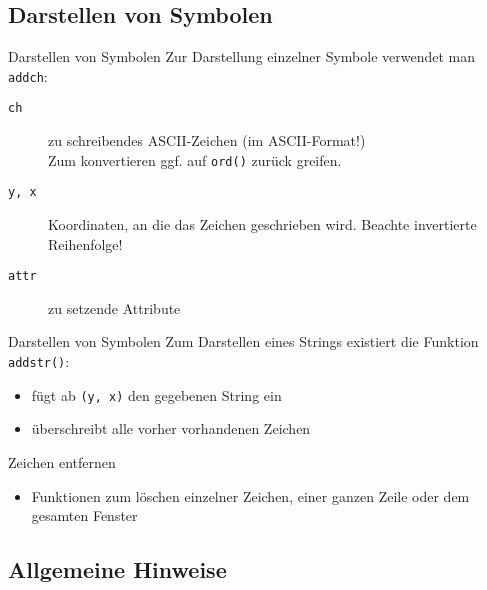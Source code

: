 \subsection{Darstellen von Symbolen}

\begin{frame}{Darstellen von Symbolen}
	Zur Darstellung einzelner Symbole verwendet man \texttt{addch}:
	
	
	
	\begin{description}
		\item [\texttt{ch}] zu schreibendes ASCII-Zeichen (im ASCII-Format!) \\ Zum konvertieren ggf. auf \texttt{ord()} zurück greifen.
		\item [\texttt{y, x}] Koordinaten, an die das Zeichen geschrieben wird. Beachte invertierte Reihenfolge!
		\item [\texttt{attr}] zu setzende Attribute
	\end{description}
\end{frame}

\begin{frame}{Darstellen von Symbolen}
	Zum Darstellen eines Strings existiert die Funktion \texttt{addstr()}:
	
	
	
	\begin{itemize}
		\item fügt ab \texttt{(y, x)} den gegebenen String ein
		\item überschreibt alle vorher vorhandenen Zeichen
	\end{itemize}
\end{frame}


\begin{frame}{Zeichen entfernen}
	
	
	\begin{itemize}
		\item Funktionen zum löschen einzelner Zeichen, einer ganzen Zeile oder dem gesamten Fenster
	\end{itemize}
\end{frame}


\subsection{Allgemeine Hinweise}


